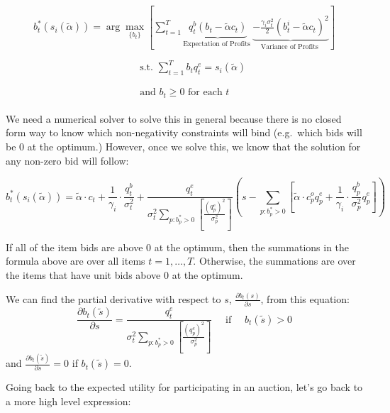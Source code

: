 \documentclass[
]{article}
\begin{document}
\[
\begin{array}{l}
b_{t}^{*}(s_{i}(\tilde{\alpha})) = \arg\max\limits _{\{ b_t \}} \left[\sum_{t=1}^{T} \underbrace{q_{t}^{b}\left(b_{t}-\tilde{\alpha} c_{t}\right)}_{\text {Expectation of Profits }} \underbrace{-\frac{{\gamma_i} \sigma_{t}^{2}}{2}\left(b_{t}^{i}-\tilde{\alpha}c_{t}\right)^{2}}_{\text {Variance of Profits }}\right] \\ \\ \qquad \qquad \qquad \qquad \qquad \begin{aligned} \text { s.t. } \sum_{t=1}^{T} b_{t} q_{t}^{e}= s_{i}(\tilde{\alpha}) \end{aligned}
\\ \\ \qquad \qquad \qquad \qquad \qquad \begin{aligned} \text { and   }  b_{t} \geq 0 \text{ for each } t\end{aligned}
\end{array}
\]

We need a numerical solver to solve this in general because there is no
closed form way to know which non-negativity constraints will bind
(e.g.~which bids will be 0 at the optimum.) However, once we solve this,
we know that the solution for any non-zero bid will follow:

\[ b_{t}^{*}(s_{i}(\tilde{\alpha})) = \tilde{\alpha} \cdot c_{t}+ \frac{1}{{\gamma_i}} \cdot \frac{q_{t}^{b}}{\sigma_{t}^{2}}+\frac{q_{t}^{e}}{\sigma_{t}^{2} \sum\limits_{p: b_{p}^{*}>0}\left[\frac{\left(q_{p}^{e}\right)^{2}}{\sigma_{p}^{2}}\right]}\left(s-\sum\limits_{p: b_{p}^{*}>0}\left[\tilde{\alpha} \cdot c_{p}^{o} q_{p}^{e}+\frac{1}{{\gamma_i}}\cdot\frac{q_{p}^{b}}{\sigma_{p}^{2}} q_{p}^{e}\right]\right)
\]

If all of the item bids are above 0 at the optimum, then the summations
in the formula above are over all items \(t = 1, \ldots, T\). Otherwise,
the summations are over the items that have unit bids above 0 at the
optimum.

We can find the partial derivative with respect to \(s\),
\(\frac{\partial b_t(s)}{\partial s}\), from this equation: \[
\frac{\partial b_t(\tilde{s})}{\partial s} = \frac{q_{t}^{e}}{\sigma_{t}^{2} \sum\limits_{p: b_{p}^{*}>0}\left[\frac{\left(q_{p}^{e}\right)^{2}}{\sigma_{p}^{2}}\right]} \quad \text{   if   } \quad b_t(\tilde{s}) > 0
\] and \(\frac{\partial b_t(\tilde{s})}{\partial s} = 0\) if
\(b_t(\tilde{s}) = 0\).

Going back to the expected utility for participating in an auction,
let's go back to a more high level expression:
\end{document}
